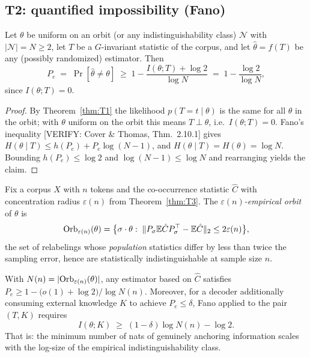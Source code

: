 \subsection{T2: quantified impossibility (Fano)}

\begin{theorem}
\label{thm:T2}
Let $\theta$ be uniform on an orbit (or any indistinguishability
class) $\mathcal{N}$ with $|\mathcal{N}|=N\ge 2$, let $T$ be a
$G$-invariant statistic of the corpus, and let
$\hat\theta=f(T)$ be any (possibly randomized) estimator. Then
\[
P_e \;=\;\Pr[\hat\theta\neq\theta]\;\ge\;
1-\frac{I(\theta;T)+\log 2}{\log N}
\;=\;1-\frac{\log 2}{\log N},
\]
since $I(\theta;T)=0$.
\end{theorem}

\begin{proof}
By Theorem~\ref{thm:T1} the likelihood $p(T=t\mid\theta)$ is the same
for all $\theta$ in the orbit; with $\theta$ uniform on the orbit this
means $T\perp\theta$, i.e.\ $I(\theta;T)=0$. Fano's inequality
[VERIFY: Cover \& Thomas, Thm.~2.10.1] gives
$H(\theta\mid T)\le h(P_e)+P_e\log(N-1)$, and
$H(\theta\mid T)=H(\theta)=\log N$. Bounding $h(P_e)\le\log 2$ and
$\log(N-1)\le\log N$ and rearranging yields the claim.
\end{proof}

\begin{definition}
\label{def:empirical-orbit}
Fix a corpus $X$ with $n$ tokens and the co-occurrence statistic
$\hat C$ with concentration radius $\varepsilon(n)$ from
Theorem~\ref{thm:T3}. The \emph{$\varepsilon(n)$-empirical orbit} of
$\theta$ is
\[
\mathrm{Orb}_{\varepsilon(n)}(\theta)=
\bigl\{\sigma\cdot\theta:\;
\|P_\sigma \mathbb{E}\hat C P_\sigma^{\top}-\mathbb{E}\hat C\|_2
\le 2\varepsilon(n)\bigr\},
\]
the set of relabelings whose \emph{population} statistics differ by
less than twice the sampling error, hence are statistically
indistinguishable at sample size $n$.
\end{definition}

\begin{corollary}
\label{cor:T2-price}
With $N(n)=|\mathrm{Orb}_{\varepsilon(n)}(\theta)|$, any estimator based on
$\hat C$ satisfies
$P_e\ge 1-\bigl(o(1)+\log 2\bigr)/\log N(n)$.
Moreover, for a decoder additionally consuming external knowledge $K$
to achieve $P_e\le\delta$, Fano applied to the pair $(T,K)$ requires
\[
I(\theta;K)\;\ge\;(1-\delta)\log N(n)-\log 2 .
\]
That is: the minimum number of nats of genuinely anchoring information
scales with the log-size of the empirical indistinguishability class.
\end{corollary}

